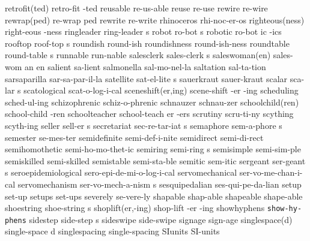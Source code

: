 \2 retrofit(ted)	retro-fit -ted
\1 reusable		re-us-able		%
\1 reuse		re-use			%
\1 rewire		re-wire 		%
\2 rewrap(ped)		re-wrap ped		%
\1 rewrite		re-write		%
\1 rhinoceros		rhi-noc-er-os
\2 righteous(ness)	right-eous -ness
\5 ringleader		ring-leader s
\5 robot		ro-bot s
\6 robotic		ro-bot ic -ics
\5 rooftop		roof-top s		%
\NewWordtrue
\1 roundish		round-ish		%
\NewWordtrue
\1 roundishness		round-ish-ness		%
\5 roundtable		round-table s
\NewWordtrue
\1 runnable		run-nable		%
\5 salesclerk		sales-clerk s
\3 saleswoman(en)	sales-wom an en
\1 salient		sa-lient		%
\1 salmonella		sal-mo-nel-la
\1 saltation		sal-ta-tion		%
\1 sarsaparilla		sar-sa-par-il-la
\5 satellite		sat-el-lite s		%
\1 sauerkraut		sauer-kraut
\NewWordtrue
\5 scalar		sca-lar s		%
\1 scatological		scat-o-log-i-cal
\3 sceneshift(er,ing)	scene-shift -er -ing	%
\1 scheduling		sched-ul-ing
\1 schizophrenic	schiz-o-phrenic
\1 schnauzer		schnau-zer
\2 schoolchild(ren)	school-child -ren
\6 schoolteacher	school-teach er -ers
\1 scrutiny		scru-ti-ny		%
\1 scything		scyth-ing
\5 seller		sell-er s		%
\5 secretariat		sec-re-tar-iat s
\5 semaphore		sem-a-phore s
\1 semester		se-mes-ter
\1 semidefinite 	semi-def-i-nite
\1 semidirect		semi-di-rect		%
\1 semihomothetic	semi-ho-mo-thet-ic
\5 semiring		semi-ring s
\1 semisimple		semi-sim-ple		%
\1 semiskilled		semi-skilled
\NewWordtrue
\1 semistable		semi-sta-ble		%
\1 semitic		sem-itic		%
\5 sergeant		ser-geant s		%
\1 seroepidemiological	sero-epi-de-mi-o-log-i-cal
\1 servomechanical	ser-vo-me-chan-i-cal	%
\5 servomechanism	ser-vo-mech-a-nism s
\1 sesquipedalian	ses-qui-pe-da-lian	%
\1 setup		set-up
\1 setups		set-ups
\1 severely		se-vere-ly
\1 shapable		shap-able		%
\1 shapeable		shape-able
\5 shoestring		shoe-string s
\3 shoplift(er,-ing)	shop-lift -er -ing	%
\1 showhyphens		{\tt\bs show-hy-phens}	%
\5 sidestep		side-step s
\1 sideswipe		side-swipe
\1 signage		sign-age		%
\2 singlespace(d)	single-space d		%
\1 singlespacing	single-spacing		%
\NewWordtrue
\1 SIunits		SI-units		%
